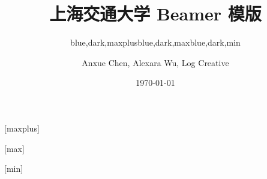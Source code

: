 \documentclass[]{ctexbeamer}
\begin{document}
\title[SJTU Beamer Template] %
{\textbf{上海交通大学 Beamer 模版}} %

\author[Anxue Chen, Alexara Wu, Log Creative]
{Anxue Chen, Alexara Wu, Log Creative}


\date{\today}

\subtitle{blue,dark,maxplus}
\logo{\resizebox{!}{0.7cm}{\zhlogo}}
[maxplus]
\maketitle

\subtitle{blue,dark,max}
\logo{\resizebox{!}{1cm}{\sjtubadge}}
\titlegraphic{\sjtubg[opacity=0.2]}
[max]
\maketitle

\subtitle{blue,dark,min}
\logo{\resizebox{!}{0.7cm}{\enlogo}}
[min]
\maketitle
\end{document}
